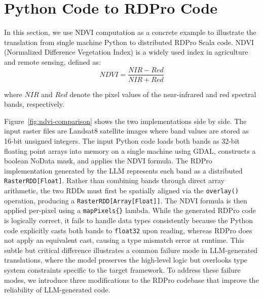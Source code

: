 \section{Python Code to RDPro Code}
In this section, we use NDVI computation as a concrete example to illustrate  the translation from single machine Python to distributed RDPro Scala code. NDVI (Normalized Difference Vegetation Index) is a widely used index in agriculture and remote sensing, defined as:
\begin{equation}
    NDVI = \frac{NIR - Red}{NIR + Red}
\label{eq:ndvi}
\end{equation}

\noindent where $NIR$ and $Red$ denote the pixel values of the near-infrared and red spectral bands, respectively. 

Figure~\ref{fig:ndvi-comparison} shows the two implementations side by side. The input raster files are Landsat8 satellite images where band values are 
stored as 16-bit unsigned integers. The input Python code loads both bands as 32-bit floating point arrays into memory on a single machine using GDAL, constructs a boolean NoData mask, and applies the NDVI formula. The RDPro implementation generated by the LLM represents each band as a distributed \texttt{RasterRDD[Float]}. Rather than combining bands through direct 
array arithmetic, the two RDDs must first be spatially aligned via the 
\texttt{overlay()} operation, producing a \texttt{RasterRDD[Array[Float]]}. 
The NDVI formula is then applied per-pixel using a \texttt{mapPixels\{\}} 
lambda. While the generated RDPro code is logically correct, it fails to 
handle data types consistently because the Python code explicitly casts both bands to \texttt{float32} upon reading, whereas RDPro does not apply an equivalent cast, causing a type mismatch error at runtime. This subtle but critical difference illustrates a common failure mode in LLM-generated translations, where the model preserves the high-level logic but overlooks type system constraints specific to the target framework.
To address these failure modes, we introduce three modifications to the 
RDPro codebase that improve the reliability of LLM-generated code.



